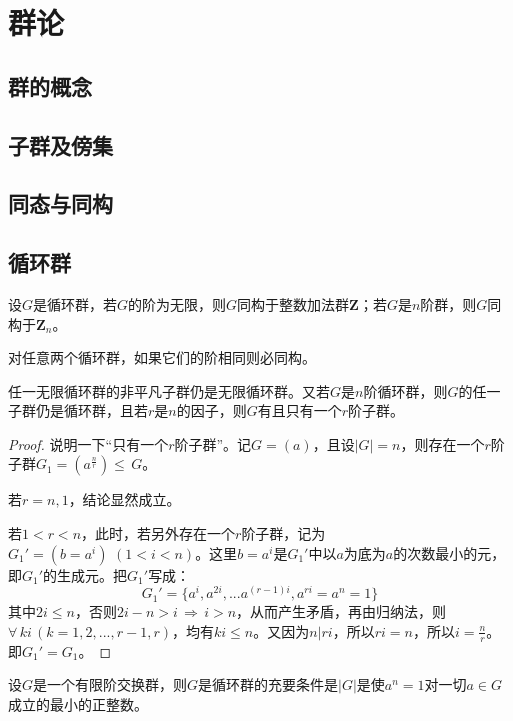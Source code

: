 \section{群论}

\subsection{群的概念}

\subsection{子群及傍集}

\subsection{同态与同构}

\subsection{循环群}

\begin{theorem}
	设$G$是循环群，若$G$的阶为无限，则$G$同构于整数加法群$\mathbf{Z}$；若$G$是$n$阶群，则$G$同构于$\mathbf{Z}_{n}$。
\end{theorem}

\begin{corollary}
	对任意两个循环群，如果它们的阶相同则必同构。
\end{corollary}

\begin{theorem}
	任一无限循环群的非平凡子群仍是无限循环群。又若$G$是$n$阶循环群，则$G$的任一子群仍是循环群，且若$r$是$n$的因子，则$G$有且只有一个$r$阶子群。
\end{theorem}
\begin{proof}
	说明一下“只有一个$r$阶子群”。记$G=(a)$，且设$|G|=n$，则存在一个$r$阶子群$G_{1}=(a^{\frac{n}{r}})\leq \, G$。\par
	若$r=n,1$，结论显然成立。\par
	若$1<r<n$，此时，若另外存在一个$r$阶子群，记为$G_{1}'=(b=a^{i})\, \, (1< i< n)$。这里$b=a^{i}$是$G_{1}'$中以$a$为底为$a$的次数最小的元，即$G_{1}'$的生成元。把$G_{1}'$写成：
	\begin{equation*}
		G_{1}'=\{a^{i},a^{2i},...a^{(r-1)i},a^{ri}=a^{n}=1\}
	\end{equation*}
	其中$2i\leq n$，否则$2i-n>i\, \Rightarrow \, i>n$，从而产生矛盾，再由归纳法，则$\forall \, ki\,(k=1,2,...,r-1,r)$，均有$ki\leq n$。又因为$n\big| ri$，所以$ri=n$，所以$i=\frac{n}{r}$。即$G_{1}'=G_{1}$。
\end{proof}
\begin{theorem}\label{Yth020403}
	设$G$是一个有限阶交换群，则$G$是循环群的充要条件是$|G|$是使$a^{n}=1$对一切$a\in G$成立的最小的正整数。
\end{theorem}

